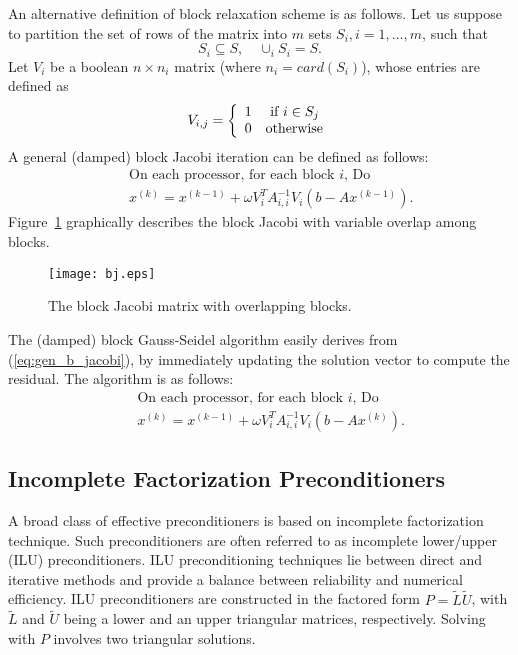 An alternative definition of block relaxation scheme is as follows.
Let us suppose to partition the set of rows of 
the matrix into $m$ sets $S_i, i=1, \ldots,m$, such that
\[
S_i \subseteq S, \quad \cup_i S_i = S.
\]
Let $V_i$ be a
boolean $n \times n_i$ matrix (where $n_i = card(S_i)$), whose entries are
defined as
\[
V_{i,j} = \left\{
\begin{array}{l l}
1 & \mbox{ if } i \in S_j \\
  0 & \mbox{otherwise}
\end{array}
  \right.
\]
A general (damped) block Jacobi iteration can be defined as follows:
\begin{eqnarray}
&& \mbox{On each processor, for each block $i$, Do} \\
&& \label{eq:gen_b_jacobi}
x^{(k)} = x^{(k-1)} + \omega V_i^T A_{i,i}^{-1} V_i(b - A x^{(k-1)}).
\end{eqnarray}
Figure~\ref{fig:bj} graphically describes the block Jacobi with variable
overlap among blocks.

\begin{figure}
\begin{center}
\texttt{[image: bj.eps]}
\end{center}
\caption{The block Jacobi matrix with overlapping blocks.}
\label{fig:bj}
\end{figure}

The (damped) block Gauss-Seidel algorithm easily derives from
(\ref{eq:gen_b_jacobi}), by immediately updating the solution vector to
compute the residual. The algorithm is as follows:
\begin{eqnarray}
&& \mbox{On each processor, for each block $i$, Do} \\
&& \label{eq:gen_b_gs}
x^{(k)} = x^{(k-1)} + \omega V_i^T A_{i,i}^{-1} V_i(b - A x^{(k)}).
\end{eqnarray}

\subsection{Incomplete Factorization Preconditioners}
\label{sec:ilu}

A broad class of effective preconditioners is based on incomplete
factorization technique.  Such preconditioners are often referred to as
incomplete lower/upper (ILU) preconditioners.  ILU preconditioning techniques
lie between direct and iterative methods and provide a balance between
reliability and numerical efficiency.  ILU preconditioners are constructed in
the factored form $P=\tilde{L} \tilde{U}$, with $\tilde{L}$ and $\tilde{U}$
being a lower and an upper triangular matrices, respectively. Solving with $P$
involves two triangular solutions.

